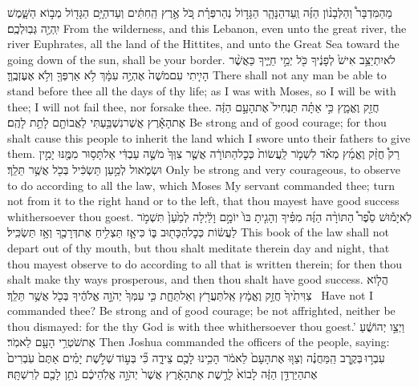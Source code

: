 {מֵהַמִּדְבָּר֩ וְהַלְּבָנ֨וֹן הַזֶּ֜ה וְֽעַד\maqqaf הַנָּהָ֧ר הַגָּד֣וֹל נְהַר\maqqaf פְּרָ֗ת כֹּ֚ל אֶ֣רֶץ הַֽחִתִּ֔ים וְעַד\maqqaf הַיָּ֥ם הַגָּד֖וֹל מְב֣וֹא הַשָּׁ֑מֶשׁ יִֽהְיֶ֖ה גְּבֽוּלְכֶֽם׃}
{From the wilderness, and this Lebanon, even unto the great river, the river Euphrates, all the land of the Hittites, and unto the Great Sea toward the going down of the sun, shall be your border.}
{לֹא\maqqaf יִתְיַצֵּ֥ב אִישׁ֙ לְפָנֶ֔יךָ כֹּ֖ל יְמֵ֣י חַיֶּ֑יךָ כַּאֲשֶׁ֨ר הָיִ֤יתִי עִם\maqqaf מֹשֶׁה֙ אֶהְיֶ֣ה עִמָּ֔ךְ לֹ֥א אַרְפְּךָ֖ וְלֹ֥א אֶעֶזְבֶֽךָּ׃}
{There shall not any man be able to stand before thee all the days of thy life; as I was with Moses, so I will be with thee; I will not fail thee, nor forsake thee.}
{חֲזַ֖ק וֶאֱמָ֑ץ כִּ֣י אַתָּ֗ה תַּנְחִיל֙ אֶת\maqqaf הָעָ֣ם הַזֶּ֔ה אֶת\maqqaf הָאָ֕רֶץ אֲשֶׁר\maqqaf נִשְׁבַּ֥עְתִּי לַאֲבוֹתָ֖ם לָתֵ֥ת לָהֶֽם׃}
{Be strong and of good courage; for thou shalt cause this people to inherit the land which I swore unto their fathers to give them.}
{רַק֩ חֲזַ֨ק וֶאֱמַ֜ץ מְאֹ֗ד לִשְׁמֹ֤ר לַֽעֲשׂוֹת֙ כְּכׇל\maqqaf הַתּוֹרָ֔ה אֲשֶׁ֤ר צִוְּךָ֙ מֹשֶׁ֣ה עַבְדִּ֔י אַל\maqqaf תָּס֥וּר מִמֶּ֖נּוּ יָמִ֣ין וּשְׂמֹ֑אול לְמַ֣עַן תַּשְׂכִּ֔יל בְּכֹ֖ל אֲשֶׁ֥ר תֵּלֵֽךְ׃}
{Only be strong and very courageous, to observe to do according to all the law, which Moses My servant commanded thee; turn not from it to the right hand or to the left, that thou mayest have good success whithersoever thou goest.}
{לֹֽא\maqqaf יָמ֡וּשׁ סֵ֩פֶר֩ הַתּוֹרָ֨ה הַזֶּ֜ה מִפִּ֗יךָ וְהָגִ֤יתָ בּוֹ֙ יוֹמָ֣ם וָלַ֔יְלָה לְמַ֙עַן֙ תִּשְׁמֹ֣ר לַעֲשׂ֔וֹת כְּכׇל\maqqaf הַכָּת֖וּב בּ֑וֹ כִּי\maqqaf אָ֛ז תַּצְלִ֥יחַ אֶת\maqqaf דְּרָכֶ֖ךָ וְאָ֥ז תַּשְׂכִּֽיל׃}
{This book of the law shall not depart out of thy mouth, but thou shalt meditate therein day and night, that thou mayest observe to do according to all that is written therein; for then thou shalt make thy ways prosperous, and then thou shalt have good success.}
{הֲל֤וֹא צִוִּיתִ֙יךָ֙ חֲזַ֣ק וֶאֱמָ֔ץ אַֽל\maqqaf תַּעֲרֹ֖ץ וְאַל\maqqaf תֵּחָ֑ת כִּ֤י עִמְּךָ֙ יְהֹוָ֣ה אֱלֹהֶ֔יךָ בְּכֹ֖ל אֲשֶׁ֥ר תֵּלֵֽךְ׃ \petucha }
{Have not I commanded thee? Be strong and of good courage; be not affrighted, neither be thou dismayed: for the \lord\space thy God is with thee whithersoever thou goest.’}
{וַיְצַ֣ו יְהוֹשֻׁ֔עַ אֶת\maqqaf שֹׁטְרֵ֥י הָעָ֖ם לֵאמֹֽר׃}
{Then Joshua commanded the officers of the people, saying:}
{עִבְר֣וּ \legarmeh  בְּקֶ֣רֶב הַֽמַּחֲנֶ֗ה וְצַוּ֤וּ אֶת\maqqaf הָעָם֙ לֵאמֹ֔ר הָכִ֥ינוּ לָכֶ֖ם צֵידָ֑ה כִּ֞י בְּע֣וֹד \legarmeh  שְׁלֹ֣שֶׁת יָמִ֗ים אַתֶּם֙ עֹֽבְרִים֙ אֶת\maqqaf הַיַּרְדֵּ֣ן הַזֶּ֔ה לָבוֹא֙ לָרֶ֣שֶׁת אֶת\maqqaf הָאָ֔רֶץ אֲשֶׁר֙ יְהֹוָ֣ה אֱלֹֽהֵיכֶ֔ם נֹתֵ֥ן לָכֶ֖ם לְרִשְׁתָּֽהּ׃ \petucha }
